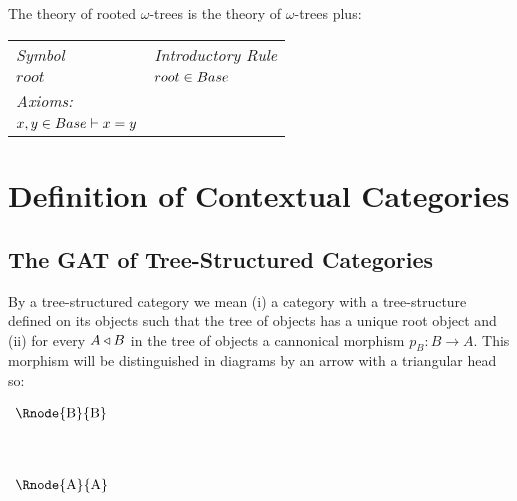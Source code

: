 \documentclass[10pt,a4paper]{scrartcl}
\begin{document}
\noindent
The theory of rooted $\omega$-trees is the theory of $\omega$-trees plus: \\

\vspace{0.03cm} 
\begin{tabular}{>{\itshape}l l}
Symbol & \itshape{Introductory Rule} \\
$root$ & $root \in Base$ \\
\itshape{Axioms}:  \\
$x,y \in Base \vdash x = y$
\end{tabular} 

\section{Definition of Contextual Categories}
\subsection {The GAT of Tree-Structured Categories}

By a tree-structured category we mean (i) a category with a tree-structure defined on its objects such that the tree of objects has a unique root object and (ii) for every $A \triangleleft B$ in the tree of objects  a cannonical morphism $p_B:B \rightarrow A$. This morphism will be distinguished in diagrams by an arrow with  
a triangular head so:

\begin{center}
$
\begin{array}{p{2cm}p{0.5cm}p{0.5cm}p{0.5cm}}
\Rnode{B}{B}& \\ [1.4cm]
\Rnode{A}{A} \\
\end{array}
$

\end{center}

\newcommand{\Obi}[1]{\Ob_{#1}}
\newcommand{\Homij}[2]{\Hom_{#1,#2}}
\newcommand{\ofObi}[2]{#1 \bbin{#2}{\Ob}}
\newcommand{\HomijBar}[4]{\Homij{#1}{#2}(#3,#4)}
\newcommand{\ofHomij}[5]{\ofT{#1}{\HomijBar{#2}{#3}{#4}{#5}}}
\newcommand{\HomijBarFt}[4]{\Homij{#1}{#2}(#3,\ft{#4})}
\newcommand{\ofHomiBarFt}[4]{\ofT{#1}{\HomijBarFt{#2}{#2-1}{#3}{#4}}}
\end{document}

